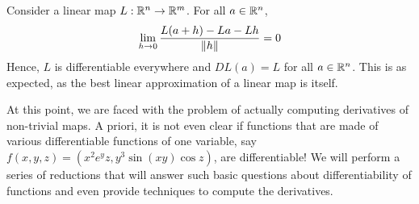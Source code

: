 \documentclass[../Analysis-3]{subfiles}
\begin{document}
\begin{Eg}{}{}
  Consider a linear map $ L:\mathbb{R}^n \to \mathbb{R}^m $. For all $ a \in \mathbb{R}^n $,
  \[ \lim_{h \to 0} \frac{L(a+h)-La-Lh}{\norm{h}} = 0 \]
  Hence, $ L $ is differentiable everywhere and $ DL(a) = L $ for all $ a \in \mathbb{R}^n $. This is as expected, as the best linear approximation of a linear map is itself.
\end{Eg}

At this point, we are faced with the problem of actually computing derivatives of non-trivial maps. A priori, it is not even clear if functions that are made of various differentiable functions of one variable, say $ f(x,y,z) = (x^2e^yz, y^3\sin (xy) \cos z) $, are differentiable! We will perform a series of reductions that will answer such basic questions about differentiability of functions and even provide techniques to compute the derivatives.
\end{document}
